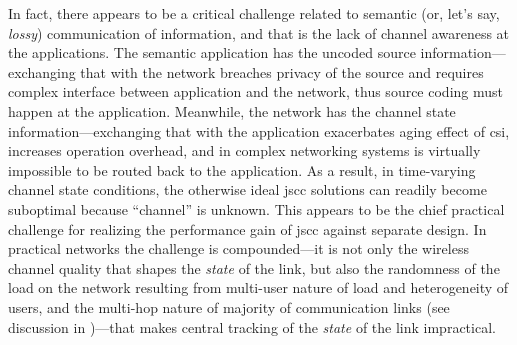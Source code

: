 In fact, there appears to be a critical challenge related to semantic (or, let's say, \emph{lossy}) communication of information, and that is the lack of channel awareness at the applications. %
The semantic application has the uncoded source information---exchanging that with the network breaches privacy of the source and requires complex interface between application and the network, thus source coding must happen at the application. Meanwhile, the network has the channel state information---exchanging that with the application exacerbates aging effect of \gls{csi},  increases operation overhead, and in complex networking systems is virtually impossible to be routed back to the application. As a result, in time-varying channel state conditions, the otherwise ideal \gls{jscc} solutions can  readily become suboptimal because ``channel'' is unknown. This appears to be the chief practical challenge for realizing the performance gain of \gls{jscc} against separate design. In practical networks the challenge is  compounded---it is not only the wireless channel quality that shapes the \emph{state} of the link, but also the randomness of the load on the network resulting from multi-user nature of load and heterogeneity   of users, and the multi-hop nature of majority of communication links (see discussion in )---that makes central tracking of the \emph{state} of the link impractical.






